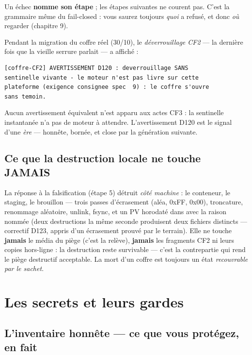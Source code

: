Un échec \textbf{nomme son étape} ; les étapes suivantes ne courent pas. C'est la
grammaire même du fail-closed : vous saurez toujours \emph{quoi} a refusé, et donc
\emph{où} regarder (chapitre 9).

\begin{terrain}
Pendant la migration du coffre réel (30/10), le \emph{déverrouillage CF2} — la
dernière fois que la vieille serrure parlait — a affiché :
\begin{lstlisting}
[coffre-CF2] AVERTISSEMENT D120 : deverrouillage SANS
sentinelle vivante - le moteur n'est pas livre sur cette
plateforme (exigence consignee spec  9) : le coffre s'ouvre
sans temoin.
\end{lstlisting}
Aucun avertissement équivalent n'est apparu aux actes CF3 : la sentinelle instantanée
n'a pas de moteur à attendre. L'avertissement D120 est le signal d'une \emph{ère} —
honnête, bornée, et close par la génération suivante.
\end{terrain}

\subsection{Ce que la destruction locale ne touche JAMAIS}

La réponse à la falsification (étape 5) détruit \emph{côté machine} : le conteneur, le
staging, le brouillon — trois passes d'écrasement (aléa, 0xFF, 0x00), troncature,
renommage aléatoire, unlink, fsync, et un PV horodaté dans  avec la
raison nommée (deux destructions la même seconde produisent deux fichiers distincts —
correctif D123, appris d'un écrasement prouvé par le terrain). Elle ne touche
\textbf{jamais} le média du piège (c'est la relève), \textbf{jamais} les fragments CF2
ni leurs copies hors-ligne : la destruction reste survivable — c'est la contrepartie
qui rend le piège destructif acceptable. La mort d'un coffre est toujours un état
\emph{recouvrable par le sachet}.

\section{Les secrets et leurs gardes}\label{sec:gards}

\subsection{L'inventaire honnête — ce que vous protégez, en fait}

